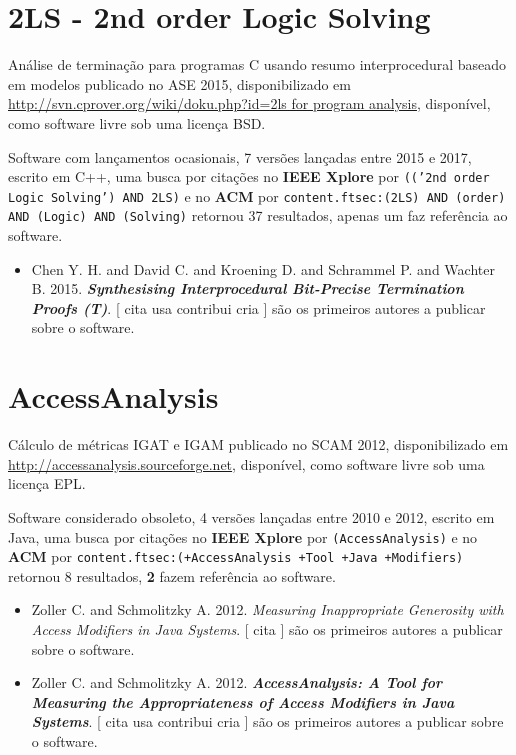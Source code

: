 
%

\label{softwares-summary}

\section{2LS - 2nd order Logic Solving}

Análise de terminação para programas C usando resumo interprocedural baseado em modelos
publicado no ASE 2015,
disponibilizado em \url{http://svn.cprover.org/wiki/doku.php?id=2ls for program analysis},
disponível,
como software livre
sob uma licença BSD.

Software com lançamentos ocasionais,
7 versões lançadas
entre 2015 e 2017,
escrito em C++,
uma busca por citações no {\bf IEEE Xplore} por
\texttt{(('2nd order Logic Solving') AND 2LS)}
e no {\bf ACM} por
\texttt{content.ftsec:(2LS) AND (order) AND (Logic) AND (Solving)}
retornou
37 resultados,
apenas um faz referência ao software.

\begin{itemize}
\item Chen Y. H. and David C. and Kroening D. and Schrammel P. and Wachter B.
      2015.
        \textbf{\textit{ Synthesising Interprocedural Bit-Precise Termination Proofs (T)}}.
      [
          cita
          usa
          contribui
          cria
      ]
são os primeiros autores a publicar sobre o software.
\end{itemize}
\section{AccessAnalysis}

Cálculo de métricas IGAT e IGAM
publicado no SCAM 2012,
disponibilizado em \url{http://accessanalysis.sourceforge.net},
disponível,
como software livre
sob uma licença EPL.

Software considerado obsoleto,
4 versões lançadas
entre 2010 e 2012,
escrito em Java,
uma busca por citações no {\bf IEEE Xplore} por
\texttt{(AccessAnalysis)}
e no {\bf ACM} por
\texttt{content.ftsec:(+AccessAnalysis +Tool +Java +Modifiers)}
retornou
8 resultados,
{\bf 2} fazem referência ao software.

\begin{itemize}
\item Zoller C. and Schmolitzky A.
      2012.
        \textit{ Measuring Inappropriate Generosity with Access Modifiers in Java Systems}.
      [
          cita
      ]
são os primeiros autores a publicar sobre o software.
\item Zoller C. and Schmolitzky A.
      2012.
        \textbf{\textit{ AccessAnalysis: A Tool for Measuring the Appropriateness of Access Modifiers in Java Systems}}.
      [
          cita
          usa
          contribui
          cria
      ]
são os primeiros autores a publicar sobre o software.
\end{itemize}
